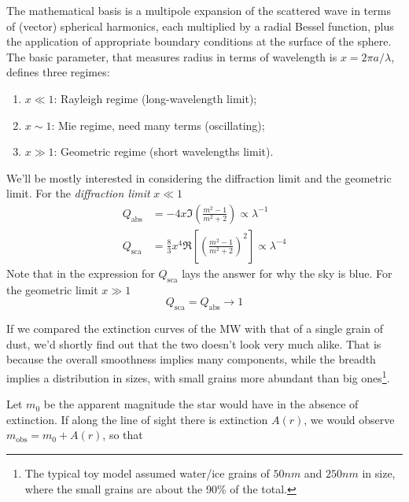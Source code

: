 \par The mathematical basis is a multipole expansion of the scattered wave in terms of (vector) spherical harmonics, each multiplied by a radial Bessel function, plus the application of appropriate boundary conditions at the surface of the sphere. The basic parameter, that measures radius in terms of wavelength is $x = 2\pi a/\lambda$, defines three regimes:
\begin{enumerate}
    \item $x \ll 1$: Rayleigh regime (long-wavelength limit);
    \item $x \sim 1$: Mie regime, need many terms (oscillating);
    \item $x \gg 1$: Geometric regime (short wavelengths limit).
\end{enumerate}
\begin{tcolorbox}[enhanced,attach boxed title to top center={yshift=-3mm,yshifttext=-1mm},
  colback=blue!5!white,colframe=blue!75!black,colbacktitle=blue!80!black,
  title=Limits,
  boxed title style={size=small,colframe=blue!50!black}]
  We'll be mostly interested in considering the diffraction limit and the geometric limit. For the \emph{diffraction limit} $x \ll 1$
  \begin{align*}
        Q_{\text{abs}} &= -4x\Im\left(\frac{m^{2}-1}{m^{2}+2}\right)\propto \lambda^{-1}\\
        Q_{\text{sca}} &= \frac{8}{3}x^{4}\Re\left[\left(\frac{m^{2}-1}{m^{2}+2}\right)^{2}\right]\propto \lambda^{-4}
  \end{align*}
  Note that in the expression for $Q_{\text{sca}}$ lays the answer for why the sky is blue. For the geometric limit $x \gg 1$
  \begin{equation*}
    Q_{\text{sca}} = Q_{\text{abs}} \to 1
  \end{equation*}
\end{tcolorbox}
If we compared the extinction curves of the MW with that of a single grain of dust, we'd shortly find out that the two doesn't look very much alike. That is because the overall smoothness implies many components, while the breadth implies a distribution in sizes, with small grains more abundant than big ones\footnote{The typical toy model assumed water/ice grains of $50\unit{nm}$ and $250\unit{nm}$ in size, where the small grains are about the 90\% of the total.}.
\par Let $m_{0}$ be the apparent magnitude the star would have in the absence of extinction. If along the line of sight there is extinction $A(r)$, we would observe $m_{\text{obs}} = m_{0} + A(r)$, so that
